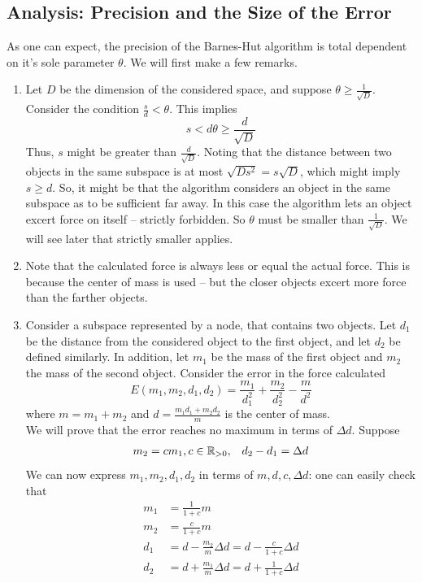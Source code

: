 \subsection{Analysis: Precision and the Size of the Error}
As one can expect, the precision of the Barnes-Hut algorithm is total dependent on it's sole parameter $\theta$. We will first make a few remarks.
\begin{enumerate}
\item Let $D$ be the dimension of the considered space, and suppose $\theta \geq \frac{1}{\sqrt{D}}$. Consider the condition $\frac{s}{d} < \theta$. This implies
\[
s < d\theta \geq \frac{d}{\sqrt{D}}
\]
Thus, $s$ might be greater than $\frac{d}{\sqrt{D}}$. Noting that the distance between two objects in the same subspace is at most $\sqrt{Ds^2} = s\sqrt{D}$, which might imply $s\geq d$. So, it might be that the algorithm considers an object in the same subspace as to be sufficient far away. In this case the algorithm lets an object excert force on itself -- strictly forbidden. So $\theta$ must be smaller than $\frac{1}{\sqrt{D}}$. We will see later that strictly smaller applies.
\item Note that the calculated force is always less or equal the actual force. This is because the center of mass is used -- but the closer objects excert more force than the farther objects.
\item Consider a subspace represented by a node, that contains two objects. Let $d_1$ be the distance from the considered object to the first object, and let $d_2$ be defined similarly. In addition, let $m_1$ be the mass of the first object and $m_2$ the mass of the second object. Consider the error in the force calculated
\[
E(m_1,m_2,d_1,d_2) = \frac{m_1}{d_1^2}+\frac{m_2}{d_2^2}-\frac{m}{d^2}
\]
where $m = m_1+m_2$ and $d = \frac{m_1d_1+m_2d_2}{m}$ is the center of mass.\\
We will prove that the error reaches no maximum in terms of $\Delta d$. Suppose
\[
\begin{array}{cc}
m_2 = cm_1, c\in \mathbb{R}_{>0}, & d_2-d_1 = \Delta d
\end{array}
\]
We can now express $m_1,m_2,d_1,d_2$ in terms of $m,d,c,\Delta d$: one can easily check that
\begin{align*}
m_1 &= \frac{1}{1+c}m\\
m_2 &= \frac{c}{1+c}m\\
d_1 &= d-\frac{m_2}{m}\Delta d = d-\frac{c}{1+c}\Delta d\\
d_2 &= d+\frac{m_1}{m}\Delta d = d+\frac{1}{1+c}\Delta d

\end{align*}
\end{enumerate}
